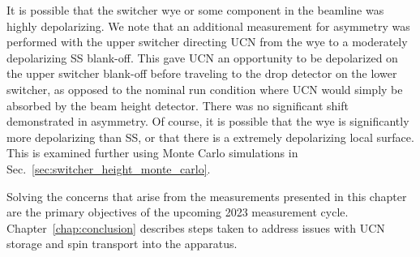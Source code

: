 It is possible that the switcher wye or some component in the beamline was highly depolarizing. We note that an additional measurement for asymmetry was performed with the upper switcher directing UCN from the wye to a moderately depolarizing SS blank-off. This gave UCN an opportunity to be depolarized on the upper switcher blank-off before traveling to the drop detector on the lower switcher, as opposed to the nominal run condition where UCN would simply be absorbed by the beam height detector. There was no significant shift demonstrated in asymmetry. Of course, it is possible that the wye is significantly more depolarizing than SS, or that there is a extremely depolarizing local surface. This is examined further using Monte Carlo simulations in Sec.~\ref{sec:switcher_height_monte_carlo}.

Solving the concerns that arise from the measurements presented in this chapter are the primary objectives of the upcoming 2023 measurement cycle. Chapter~\ref{chap:conclusion} describes steps taken to address issues with UCN storage and spin transport into the apparatus.
